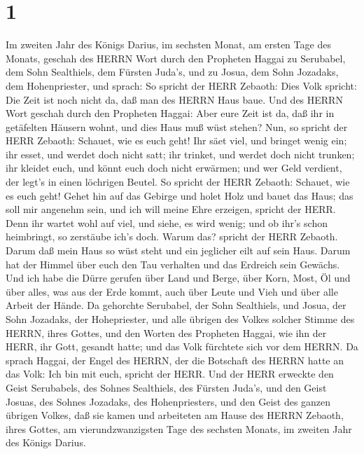 \hypertarget{section}{%
\section{1}\label{section}}

 Im zweiten Jahr des Königs Darius, im sechsten Monat, am
ersten Tage des Monats, geschah des HERRN Wort durch den Propheten
Haggai zu Serubabel, dem Sohn Sealthiels, dem Fürsten Juda's, und zu
Josua, dem Sohn Jozadaks, dem Hohenpriester, und sprach:  So
spricht der HERR Zebaoth: Dies Volk spricht: Die Zeit ist noch nicht da,
daß man des HERRN Haus baue.  Und des HERRN Wort geschah
durch den Propheten Haggai:  Aber eure Zeit ist da, daß ihr
in getäfelten Häusern wohnt, und dies Haus muß wüst stehen? 
Nun, so spricht der HERR Zebaoth: Schauet, wie es euch geht!
 Ihr säet viel, und bringet wenig ein; ihr esset, und werdet
doch nicht satt; ihr trinket, und werdet doch nicht trunken; ihr kleidet
euch, und könnt euch doch nicht erwärmen; und wer Geld verdient, der
legt's in einen löchrigen Beutel.  So spricht der HERR
Zebaoth: Schauet, wie es euch geht!  Gehet hin auf das
Gebirge und holet Holz und bauet das Haus; das soll mir angenehm sein,
und ich will meine Ehre erzeigen, spricht der HERR.  Denn
ihr wartet wohl auf viel, und siehe, es wird wenig; und ob ihr's schon
heimbringt, so zerstäube ich's doch. Warum das? spricht der HERR
Zebaoth. Darum daß mein Haus so wüst steht und ein jeglicher eilt auf
sein Haus.  Darum hat der Himmel über euch den Tau
verhalten und das Erdreich sein Gewächs.  Und ich habe die
Dürre gerufen über Land und Berge, über Korn, Most, Öl und über alles,
was aus der Erde kommt, auch über Leute und Vieh und über alle Arbeit
der Hände.  Da gehorchte Serubabel, der Sohn Sealthiels,
und Josua, der Sohn Jozadaks, der Hohepriester, und alle übrigen des
Volkes solcher Stimme des HERRN, ihres Gottes, und den Worten des
Propheten Haggai, wie ihn der HERR, ihr Gott, gesandt hatte; und das
Volk fürchtete sich vor dem HERRN.  Da sprach Haggai, der
Engel des HERRN, der die Botschaft des HERRN hatte an das Volk: Ich bin
mit euch, spricht der HERR.  Und der HERR erweckte den
Geist Serubabels, des Sohnes Sealthiels, des Fürsten Juda's, und den
Geist Josuas, des Sohnes Jozadaks, des Hohenpriesters, und den Geist des
ganzen übrigen Volkes, daß sie kamen und arbeiteten am Hause des HERRN
Zebaoth, ihres Gottes,  am vierundzwanzigsten Tage des
sechsten Monats, im zweiten Jahr des Königs Darius.

